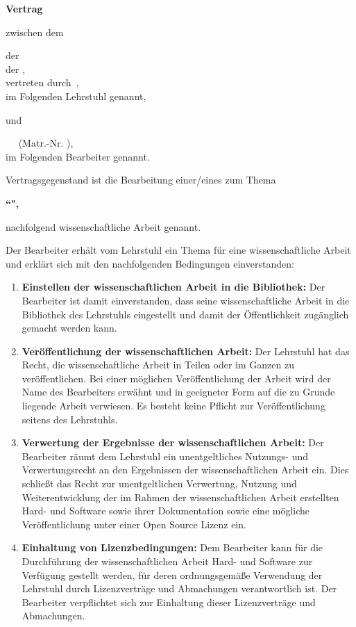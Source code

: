 \documentclass[german,11pt]{netforms}
\begin{document}
\netformheader

\textbf{\LARGE Vertrag}

\vskip2.5mm
zwischen dem

\vskip2mm
\hfill\begin{minipage}{.9\textwidth}
\NETname der\\
\INname{} der \TUMname,\\
vertreten durch\
\NEThead,\\
im Folgenden \glqq{}Lehrstuhl\grqq{} genannt,
\end{minipage}

\vskip2mm
und

\vskip2mm
\hfill\begin{minipage}{.9\textwidth}
\theanrede\ \thevorname\
\textbf{\thenachname} (Matr.-Nr. \thematrikel),\\
im Folgenden \glqq{}Bearbeiter\grqq{} genannt.
\end{minipage}

\vskip5mm
Vertragsgegenstand ist die Bearbeitung einer/eines \textbf{\thetype} zum Thema
\begin{center}
	\bfseries ``\thetitleenglish",
\end{center}
nachfolgend \glqq{}wissenschaftliche Arbeit\grqq{} genannt.

\vskip5mm
Der Bearbeiter erh\"alt vom Lehrstuhl ein Thema f\"ur eine wissenschaftliche
Arbeit und erkl\"art sich mit den nachfolgenden Bedingungen einverstanden:
\begin{enumerate}
	\item \textbf{Einstellen der wissenschaftlichen Arbeit in die Bibliothek:}
	Der Bearbeiter ist damit einverstanden, dass seine wissenschaftliche Arbeit
	in die Bibliothek des Lehrstuhls eingestellt und damit der \"Offentlichkeit
	zug\"anglich gemacht werden kann.
	\item \textbf{Ver\"offentlichung der wissenschaftlichen Arbeit:}
	Der Lehrstuhl hat das Recht, die wissenschaftliche Arbeit in Teilen oder im
	Ganzen zu ver\"offentlichen.
	Bei einer m\"oglichen Ver\"offentlichung der Arbeit wird der Name des
	Bearbeiters erw\"ahnt und in geeigneter Form auf die zu Grunde liegende
	Arbeit verwiesen.
	Es besteht keine Pflicht zur Ver\"offentlichung seitens des Lehrstuhls.
	\item \textbf{Verwertung der Ergebnisse der wissenschaftlichen Arbeit:}
	Der Bearbeiter r\"aumt dem Lehrstuhl ein unentgeltliches Nutzungs- und
	Verwertungsrecht an den Ergebnissen der wissenschaftlichen Arbeit ein.
	Dies schlie\ss{}t das Recht zur unentgeltlichen Verwertung, Nutzung und
	Weiterentwicklung der im Rahmen der wissenschaftlichen Arbeit erstellten
	Hard- und Software sowie ihrer Dokumentation sowie eine m\"ogliche
	Ver\"offentlichung unter einer Open Source Lizenz ein.
	\item \textbf{Einhaltung von Lizenzbedingungen:}
	Dem Bearbeiter kann f\"ur die Durchf\"uhrung der wissenschaftlichen Arbeit
	Hard- und Software zur Verf\"ugung gestellt werden, f\"ur deren
	ordnungsgem\"a\ss{}e Verwendung der Lehrstuhl durch Lizenzvertr\"age und
	Abmachungen verantwortlich ist.
	Der Bearbeiter verpflichtet sich zur Einhaltung dieser Lizenzvertr\"age und
	Abmachungen.
\end{enumerate}
\end{document}
